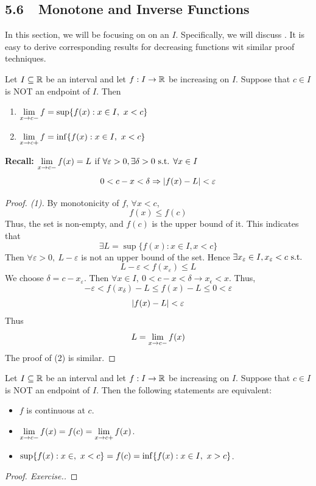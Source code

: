 \documentclass[a4paper,12pt]{article}
\begin{document}
\newpage
\subsection*{5.6\ \ Monotone and Inverse Functions}

 In this section, we will be focusing on  on an  \(I\). 
Specifically, we will discuss . It is easy to derive corresponding results for decreasing functions wit similar proof techniques.\\

\begin{theorem}
    Let \(I\subseteq\mathbb{R}\) be an interval and let \(f:I\rightarrow\mathbb{R}\) be increasing on \(I\). Suppose that \(c\in I\) is NOT an endpoint of \(I\). Then 
    \begin{enumerate}
        \item \(\ds\limx{c- }{f }=\sup\{f(x):x\in I,\ x<c\}\)
        \item \(\ds\limx{c+ }{f }=\inf\{f(x):x\in I,\ x<c\}\)
    \end{enumerate}
    \textbf{Recall:} \(\displaystyle\lim_{x\rightarrow c-} {f(x)=L}\) if \(\forall \varepsilon>0, \exists\delta>0\text{ s.t. }\forall x\in I\) 
    \[0<c-x<\delta\Rightarrow\left\lvert f(x)-L\right\rvert<\varepsilon\]
    \begin{proof}[Proof. (1)] 
        By monotonicity of \(f\), \(\forall x<c\),
        \[f(x)\le f(c)\]
        Thus, the set is non-empty, and \(f(c)\) is the upper bound of it. This indicates that 
        \[\exists L=\sup\{f(x):x\in I, x<c\}\]
        Then \(\forall\varepsilon>0,\ L-\varepsilon\) is not an upper bound of the set. Hence \(\exists x_\varepsilon\in I, x_\varepsilon<c\text{ s.t. }\)
        \[L-\varepsilon<f(x_\varepsilon)\le L\]
        We choose \(\delta=c-x_\varepsilon\). Then \(\forall x\in I,\ 0<c-x<\delta\rightarrow x_\epsilon<x\). Thus,
        \[-\varepsilon<f(x_\delta)-L\le f(x)-L\le 0<\varepsilon\]
        \[\left\lvert f(x)-L\right\rvert<\varepsilon\]
        Thus \[L=\lim_{x\rightarrow c- } {f(x)}\]
        The proof of (2) is similar.
    \end{proof}
\end{theorem}

\begin{corollary}
    Let \(I\subseteq\mathbb{R}\) be an interval and let \(f:I\rightarrow\mathbb{R}\) be increasing on \(I\). Suppose that \(c\in I\) is NOT an endpoint of \(I\). 
    Then the following statements are equivalent:
    \begin{itemize}
        \item \(f\) is continuous at \(c\).
        \item \(\displaystyle \lim_{x\rightarrow c-} {f(x)}=f(c)=\lim_{x\rightarrow c+} {f(x)}\).
        \item \(\ds \sup\{f(x):x\in,\ x<c\}=f(c)=\inf\{f(x):x\in I,\ x>c\}\).
    \end{itemize}

    \begin{proof}[Proof. Exercise.]
    
    \end{proof}
\end{corollary}
\end{document}
